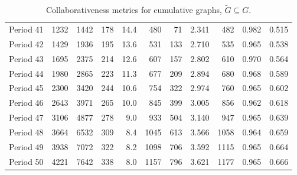 \documentclass{article}
\theoremstyle{definition}
\begin{document}
\begin{table}[!hbtp]
{\begin{tabular}{lrrrrrrrrrr}
            Period 41 &     1232 &     1442 &               178 &              14.4 &                     480 &                         71 &       2.341 &            482 &       0.982 &             0.515 \\
            Period 42 &     1429 &     1936 &               195 &              13.6 &                     531 &                        133 &       2.710 &            535 &       0.965 &             0.538 \\
            Period 43 &     1695 &     2375 &               214 &              12.6 &                     607 &                        157 &       2.802 &            610 &       0.970 &             0.564 \\
            Period 44 &     1980 &     2865 &               223 &              11.3 &                     677 &                        209 &       2.894 &            680 &       0.968 &             0.589 \\
            Period 45 &     2300 &     3420 &               244 &              10.6 &                     754 &                        322 &       2.974 &            760 &       0.965 &             0.602 \\
            Period 46 &     2643 &     3971 &               265 &              10.0 &                     845 &                        399 &       3.005 &            856 &       0.962 &             0.618 \\
            Period 47 &     3106 &     4877 &               278 &               9.0 &                     933 &                        504 &       3.140 &            947 &       0.965 &             0.639 \\
            Period 48 &     3664 &     6532 &               309 &               8.4 &                    1045 &                        613 &       3.566 &           1058 &       0.964 &             0.659 \\
            Period 49 &     3938 &     7072 &               322 &               8.2 &                    1098 &                        706 &       3.592 &           1115 &       0.965 &             0.664 \\
            Period 50 &     4221 &     7642 &               338 &               8.0 &                    1157 &                        796 &       3.621 &           1177 &       0.965 &             0.666 \\
            \bottomrule
            \end{tabular}
}
    \caption{Collaborativeness metrics for cumulative graphs, \(\tilde{G} \subseteq G\).}
\end{table}
\end{document}
